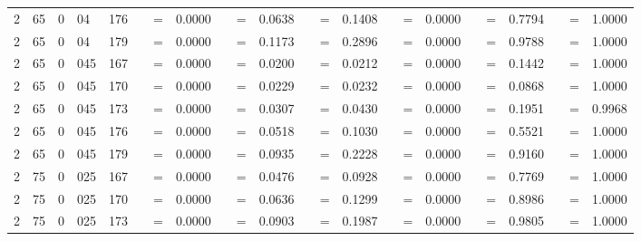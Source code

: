 \begin{tabular*}{260mm}{r@{.}lr@{.}lc|ccc:ccc:ccc:ccc:ccc|ccc}
		2&65	&	0&04	&	176	&	\nicefrac{}{} &=& 0.0000 & 	 &=& 0.0638 & 	 &=& 0.1408 & 	\nicefrac{}{} &=& 0.0000 & 	 &=& 0.7794 & 	 &=& 1.0000 \\ 
		2&65	&	0&04	&	179	&	\nicefrac{}{} &=& 0.0000 & 	 &=& 0.1173 & 	 &=& 0.2896 & 	\nicefrac{}{} &=& 0.0000 & 	 &=& 0.9788 & 	 &=& 1.0000 \\ 
		2&65	&	0&045	&	167	&	\nicefrac{}{} &=& 0.0000 & 	 &=& 0.0200 & 	 &=& 0.0212 & 	\nicefrac{}{} &=& 0.0000 & 	 &=& 0.1442 & 	 &=& 1.0000 \\ 
		2&65	&	0&045	&	170	&	\nicefrac{}{} &=& 0.0000 & 	 &=& 0.0229 & 	 &=& 0.0232 & 	\nicefrac{}{} &=& 0.0000 & 	 &=& 0.0868 & 	 &=& 1.0000 \\ 
		2&65	&	0&045	&	173	&	\nicefrac{}{} &=& 0.0000 & 	 &=& 0.0307 & 	 &=& 0.0430 & 	\nicefrac{}{} &=& 0.0000 & 	 &=& 0.1951 & 	 &=& 0.9968 \\ 
		2&65	&	0&045	&	176	&	\nicefrac{}{} &=& 0.0000 & 	 &=& 0.0518 & 	 &=& 0.1030 & 	\nicefrac{}{} &=& 0.0000 & 	 &=& 0.5521 & 	 &=& 1.0000 \\ 
		2&65	&	0&045	&	179	&	\nicefrac{}{} &=& 0.0000 & 	 &=& 0.0935 & 	 &=& 0.2228 & 	\nicefrac{}{} &=& 0.0000 & 	 &=& 0.9160 & 	 &=& 1.0000 \\ 
		2&75	&	0&025	&	167	&	\nicefrac{}{} &=& 0.0000 & 	 &=& 0.0476 & 	 &=& 0.0928 & 	\nicefrac{}{} &=& 0.0000 & 	 &=& 0.7769 & 	 &=& 1.0000 \\ 
		2&75	&	0&025	&	170	&	\nicefrac{}{} &=& 0.0000 & 	 &=& 0.0636 & 	 &=& 0.1299 & 	\nicefrac{}{} &=& 0.0000 & 	 &=& 0.8986 & 	 &=& 1.0000 \\ 
		2&75	&	0&025	&	173	&	\nicefrac{}{} &=& 0.0000 & 	 &=& 0.0903 & 	 &=& 0.1987 & 	\nicefrac{}{} &=& 0.0000 & 	 &=& 0.9805 & 	 &=& 1.0000 \\ 

\end{tabular*}
